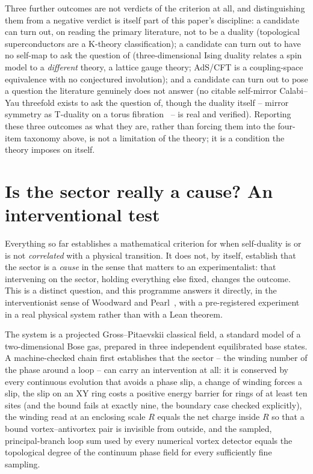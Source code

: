 \documentclass[11pt,a4paper]{article}
\begin{document}
Three further outcomes are not verdicts of the criterion at all, and distinguishing them from a
negative verdict is itself part of this paper's discipline: a candidate can turn out, on reading the
primary literature, not to be a duality (topological superconductors are a K-theory classification);
a candidate can turn out to have no self-map to ask the question of (three-dimensional Ising duality
relates a spin model to a \emph{different} theory, a lattice gauge theory; AdS/CFT is a coupling-space
equivalence with no conjectured involution); and a candidate can turn out to pose a question the
literature genuinely does not answer (no citable self-mirror Calabi--Yau threefold exists to ask the
question of, though the duality itself -- mirror symmetry as T-duality on a torus
fibration~\cite{StromingerYauZaslow1996} -- is real and verified). Reporting these three outcomes as
what they are, rather than forcing them into the four-item taxonomy above, is not a limitation of the
theory; it is a condition the theory imposes on itself.

\section{Is the sector really a cause? An interventional test}

Everything so far establishes a mathematical criterion for when self-duality is or is not
\emph{correlated} with a physical transition. It does not, by itself, establish that the sector is a
\emph{cause} in the sense that matters to an experimentalist: that intervening on the sector, holding
everything else fixed, changes the outcome. This is a distinct question, and this programme answers it
directly, in the interventionist sense of Woodward and Pearl~\cite{Callens2026Causal}, with a
pre-registered experiment in a real physical system rather than with a Lean theorem.

The system is a projected Gross--Pitaevskii classical field, a standard model of a two-dimensional
Bose gas, prepared in three independent equilibrated base states. A machine-checked chain first
establishes that the sector -- the winding number of the phase around a loop -- can carry an
intervention at all: it is conserved by every continuous evolution that avoids a phase slip, a change
of winding forces a slip, the slip on an XY ring costs a positive energy barrier for rings of at least
ten sites (and the bound fails at exactly nine, the boundary case checked explicitly), the winding
read at an enclosing scale $R$ equals the net charge inside $R$ so that a bound vortex--antivortex pair
is invisible from outside, and the sampled, principal-branch loop sum used by every numerical vortex
detector equals the topological degree of the continuum phase field for every sufficiently fine
sampling.
\end{document}
